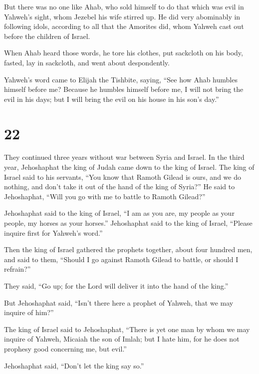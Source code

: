  But there was no one like Ahab, who sold himself to do
that which was evil in Yahweh's sight, whom Jezebel his wife stirred up.
 He did very abominably in following idols, according to
all that the Amorites did, whom Yahweh cast out before the children of
Israel.

 When Ahab heard those words, he tore his clothes, put
sackcloth on his body, fasted, lay in sackcloth, and went about
despondently.

 Yahweh's word came to Elijah the Tishbite, saying,
 ``See how Ahab humbles himself before me? Because he
humbles himself before me, I will not bring the evil in his days; but I
will bring the evil on his house in his son's day.''

\hypertarget{section-21}{%
\section{22}\label{section-21}}

 They continued three years without war between Syria and
Israel.  In the third year, Jehoshaphat the king of Judah
came down to the king of Israel.  The king of Israel said
to his servants, ``You know that Ramoth Gilead is ours, and we do
nothing, and don't take it out of the hand of the king of Syria?''
 He said to Jehoshaphat, ``Will you go with me to battle
to Ramoth Gilead?''

Jehoshaphat said to the king of Israel, ``I am as you are, my people as
your people, my horses as your horses.''  Jehoshaphat said
to the king of Israel, ``Please inquire first for Yahweh's word.''

 Then the king of Israel gathered the prophets together,
about four hundred men, and said to them, ``Should I go against Ramoth
Gilead to battle, or should I refrain?''

They said, ``Go up; for the Lord will deliver it into the hand of the
king.''

 But Jehoshaphat said, ``Isn't there here a prophet of
Yahweh, that we may inquire of him?''

 The king of Israel said to Jehoshaphat, ``There is yet
one man by whom we may inquire of Yahweh, Micaiah the son of Imlah; but
I hate him, for he does not prophesy good concerning me, but evil.''

Jehoshaphat said, ``Don't let the king say so.''


